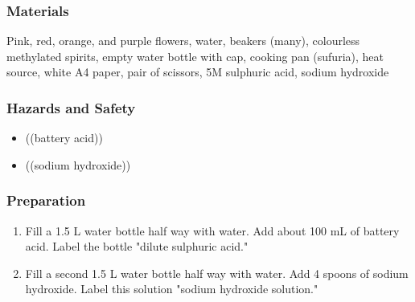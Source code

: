 \subsubsection*{Materials}
Pink, red, orange, and purple flowers, water, beakers (many), colourless methylated spirits, empty water bottle with cap, cooking pan (sufuria), heat source, white A4 paper, pair of scissors, 5M sulphuric acid, sodium hydroxide

\subsubsection*{Hazards and Safety}
\begin{itemize}
\item{((battery acid))}
\item{((sodium hydroxide))}
\end{itemize}

\subsubsection*{Preparation}
\begin{enumerate}
\item{Fill a 1.5 L water bottle half way with water. Add about 100 mL of battery acid. Label the bottle "dilute sulphuric acid."}
\item{Fill a second 1.5 L water bottle half way with water. Add 4 spoons of sodium hydroxide. Label this solution "sodium hydroxide solution."}
\end{enumerate}

